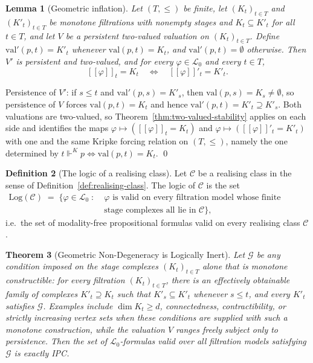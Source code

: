 \documentclass[final,12pt]{elsarticle}
\newcommand{\llbracket}{[\![}
\newcommand{\rrbracket}{]\!]}
\theoremstyle{plain}
\newtheorem{thm}{Theorem}[section]
\newtheorem{lem}[thm]{Lemma}
\theoremstyle{definition}
\newtheorem{defi}[thm]{Definition}
\begin{document}
\begin{lem}[Geometric inflation]
\label{lem:geometric-inflation}
Let \((T,\le)\) be finite, let \((K_t)_{t\in T}\) and \((K'_t)_{t\in T}\) be
monotone filtrations with nonempty stages and \(K_t\subseteq K'_t\) for all
\(t\in T\), and let \(V\) be a persistent two-valued valuation on
\((K_t)_{t\in T}\).  Define \(\mathrm{val}'(p,t)=K'_t\) whenever
\(\mathrm{val}(p,t)=K_t\), and \(\mathrm{val}'(p,t)=\emptyset\) otherwise.  Then
\(V'\) is persistent and two-valued, and for every \(\varphi\in\mathcal{L}_0\)
and every \(t\in T\),
\[
  \llbracket\varphi\rrbracket_t=K_t
  \quad\Longleftrightarrow\quad
  \llbracket\varphi\rrbracket'_t=K'_t .
\]
\end{lem}

\proof
Persistence of \(V'\): if \(s\le t\) and \(\mathrm{val}'(p,s)=K'_s\), then
\(\mathrm{val}(p,s)=K_s\neq\emptyset\), so persistence of \(V\) forces
\(\mathrm{val}(p,t)=K_t\) and hence
\(\mathrm{val}'(p,t)=K'_t\supseteq K'_s\).  Both valuations are two-valued, so
Theorem~\ref{thm:two-valued-stability} applies on each side and identifies the
maps \(\varphi\mapsto(\llbracket\varphi\rrbracket_t=K_t)\) and
\(\varphi\mapsto(\llbracket\varphi\rrbracket'_t=K'_t)\) with one and the same
Kripke forcing relation on \((T,\le)\), namely the one determined by
\(t\Vdash^{K}p\iff\mathrm{val}(p,t)=K_t\).
\qed

\begin{defi}[The logic of a realising class]
\label{def:log}
Let $\mathcal{C}$ be a realising class in the sense of Definition~\ref{def:realising-class}. The logic of $\mathcal{C}$ is the set
\[
\begin{aligned}
  \mathrm{Log}(\mathcal{C}) \;=\; \{ \varphi \in \mathcal{L}_0 \;:\;&
  \varphi \text{ is valid on every filtration model whose finite simplicial}\\
  &\text{stage complexes all lie in } \mathcal{C} \},
\end{aligned}
\]
i.e.~the set of modality-free propositional formulas valid on every realising class $\mathcal{C}$.
\end{defi}

\begin{thm}[Geometric Non-Degeneracy is Logically Inert]
\label{thm:geometry-inert}
Let \(\mathcal G\) be any condition imposed on the stage complexes
\((K_t)_{t\in T}\) alone that is \emph{monotone constructible}: for every
filtration \((K_t)_{t\in T}\), there is an effectively obtainable family of
complexes \(K'_t\supseteq K_t\) such that \(K'_s\subseteq K'_t\) whenever
\(s\le t\), and every \(K'_t\) satisfies \(\mathcal G\). Examples include
\(\dim K_t\ge d\), connectedness, contractibility, or strictly increasing vertex
sets when these conditions are supplied with such a monotone construction, while
the valuation \(V\) ranges freely subject only to persistence. Then the set of
\(\mathcal{L}_0\)-formulas valid over all filtration models satisfying \(\mathcal G\) is
exactly IPC.
\end{thm}
\end{document}
